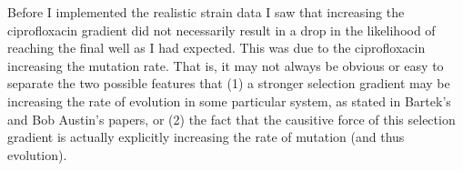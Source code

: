 \documentclass[a4paper,10pt]{article}
\begin{document}
Before I implemented the realistic strain data I saw that increasing the ciprofloxacin gradient did not necessarily result in a drop in the likelihood of reaching the final well
as I had expected.
This was due to the ciprofloxacin increasing the mutation rate. That is, it may not always be obvious or easy to separate the two possible features that (1) a
stronger selection gradient may be increasing the rate of evolution in some particular system, as stated in Bartek’s and Bob Austin’s papers, or
(2) the fact that the causitive force of this selection gradient is actually explicitly increasing the rate of mutation (and thus evolution).\\






















 
 
% 
% 


 
% 
% 
% 
% 


% 




% 
% 
% 
\end{document}
